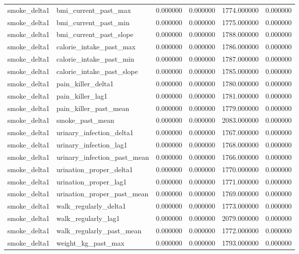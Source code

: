 \begin{longtable}{llrrrr}
smoke\_delta1 & bmi\_current\_past\_max & 0.000000 & 0.000000 & 1774.000000 & 0.000000 \\
smoke\_delta1 & bmi\_current\_past\_min & 0.000000 & 0.000000 & 1775.000000 & 0.000000 \\
smoke\_delta1 & bmi\_current\_past\_slope & 0.000000 & 0.000000 & 1788.000000 & 0.000000 \\
smoke\_delta1 & calorie\_intake\_past\_max & 0.000000 & 0.000000 & 1786.000000 & 0.000000 \\
smoke\_delta1 & calorie\_intake\_past\_min & 0.000000 & 0.000000 & 1787.000000 & 0.000000 \\
smoke\_delta1 & calorie\_intake\_past\_slope & 0.000000 & 0.000000 & 1785.000000 & 0.000000 \\
smoke\_delta1 & pain\_killer\_delta1 & 0.000000 & 0.000000 & 1780.000000 & 0.000000 \\
smoke\_delta1 & pain\_killer\_lag1 & 0.000000 & 0.000000 & 1781.000000 & 0.000000 \\
smoke\_delta1 & pain\_killer\_past\_mean & 0.000000 & 0.000000 & 1779.000000 & 0.000000 \\
smoke\_delta1 & smoke\_past\_mean & 0.000000 & 0.000000 & 2083.000000 & 0.000000 \\
smoke\_delta1 & urinary\_infection\_delta1 & 0.000000 & 0.000000 & 1767.000000 & 0.000000 \\
smoke\_delta1 & urinary\_infection\_lag1 & 0.000000 & 0.000000 & 1768.000000 & 0.000000 \\
smoke\_delta1 & urinary\_infection\_past\_mean & 0.000000 & 0.000000 & 1766.000000 & 0.000000 \\
smoke\_delta1 & urination\_proper\_delta1 & 0.000000 & 0.000000 & 1770.000000 & 0.000000 \\
smoke\_delta1 & urination\_proper\_lag1 & 0.000000 & 0.000000 & 1771.000000 & 0.000000 \\
smoke\_delta1 & urination\_proper\_past\_mean & 0.000000 & 0.000000 & 1769.000000 & 0.000000 \\
smoke\_delta1 & walk\_regularly\_delta1 & 0.000000 & 0.000000 & 1773.000000 & 0.000000 \\
smoke\_delta1 & walk\_regularly\_lag1 & 0.000000 & 0.000000 & 2079.000000 & 0.000000 \\
smoke\_delta1 & walk\_regularly\_past\_mean & 0.000000 & 0.000000 & 1772.000000 & 0.000000 \\
smoke\_delta1 & weight\_kg\_past\_max & 0.000000 & 0.000000 & 1793.000000 & 0.000000 \\

\end{longtable}
